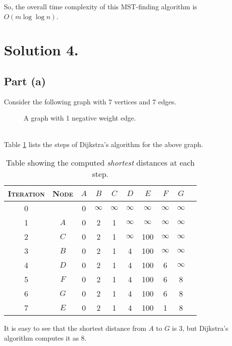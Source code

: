 \documentclass[9pt]{article}
\begin{document}
So, the overall time complexity of this MST-finding algorithm is $O(m \log{\log{n}})$.

\section*{Solution 4.}
\subsection*{Part (a)}
Consider the following graph with 7 vertices and 7 edges.
\begin{figure}[htbp]
    \centering
    \caption{A graph with 1 negative weight edge.}
\end{figure}
\vspace*{0pt} \\
Table \ref{tab:dijkstra} lists the steps of Dijkstra's algorithm for the above graph.
\begin{table}[htbp]
    \centering
    \begin{tabular}{c|c|cccccccc}
        \textsc{Iteration} & \textsc{Node} & $A$ & $B$ & $C$ & $D$ & $E$ & $F$ & $G$ \\ \hline
        0 & & 0 & $\infty$ & $\infty$ & $\infty$ & $\infty$ & $\infty$ & $\infty$ \\
        1 & $A$ & 0 & 2 & 1 & $\infty$ & $\infty$ & $\infty$ & $\infty$ \\
        2 & $C$ & 0 & 2 & 1 & $\infty$ & 100 & $\infty$ & $\infty$ \\
        3 & $B$ & 0 & 2 & 1 & 4 & 100 & $\infty$ & $\infty$ \\
        4 & $D$ & 0 & 2 & 1 & 4 & 100 & 6 & $\infty$ \\
        5 & $F$ & 0 & 2 & 1 & 4 & 100 & 6 & 8 \\
        6 & $G$ & 0 & 2 & 1 & 4 & 100 & 6 & 8 \\
        7 & $E$ & 0 & 2 & 1 & 4 & 100 & 1 & 8
    \end{tabular}
    \caption{Table showing the computed \textit{shortest} distances at each step.}
    \label{tab:dijkstra}
\end{table}
It is easy to see that the shortest distance from $A$ to $G$ is 3, but Dijkstra's algorithm
computes it as 8.
\end{document}
